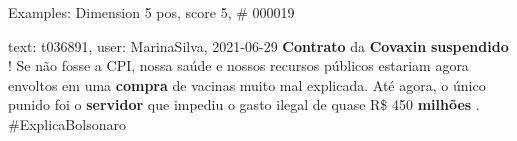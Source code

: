 \begin{frame}{Examples: Dimension 5 pos, score 5, \# 000019}
\footnotesize
\begin{exampleblock}{text: t036891, user: MarinaSilva, 2021-06-29}
\textbf{Contrato} da \textbf{Covaxin} \textbf{suspendido} ! Se não fosse a CPI, 
nossa saúde e nossos recursos públicos estariam agora envoltos em uma 
\textbf{compra} de vacinas muito mal explicada. Até agora, o único punido foi o 
\textbf{servidor} que impediu o gasto ilegal de quase R\$ 450 \textbf{milhões} 
. \#ExplicaBolsonaro 
\end{exampleblock}
\end{frame}
